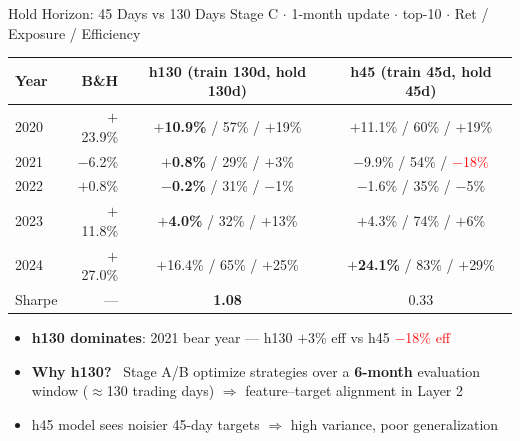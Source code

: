 \documentclass[aspectratio=169]{beamer}
\begin{document}
\begin{frame}{Hold Horizon: 45 Days vs 130 Days}
  \small
  Stage C $\cdot$ 1-month update $\cdot$ top-10 $\cdot$ Ret / Exposure / Efficiency

  \vspace{0.4em}
  \begin{tabular}{lrcc}
    \toprule
    Year & B\&H & \textbf{h130} (train 130d, hold 130d) & h45 (train 45d, hold 45d) \\
    \midrule
    2020 & $+$23.9\% & \textbf{$+$10.9\%} / 57\% / $+$19\% & $+$11.1\% / 60\% / $+$19\% \\
    2021 & $-$6.2\%  & \textbf{$+$0.8\%} / 29\% / $+$3\%  & $-$9.9\% / 54\% / \textcolor{red}{$-$18\%} \\
    2022 & $+$0.8\%  & \textbf{$-$0.2\%} / 31\% / $-$1\%  & $-$1.6\% / 35\% / $-$5\% \\
    2023 & $+$11.8\% & \textbf{$+$4.0\%} / 32\% / $+$13\% & $+$4.3\% / 74\% / $+$6\% \\
    2024 & $+$27.0\% & $+$16.4\% / 65\% / $+$25\% & \textbf{$+$24.1\%} / 83\% / $+$29\% \\
    \midrule
    Sharpe & --- & \textbf{1.08} & 0.33 \\
    \bottomrule
  \end{tabular}

  \vspace{0.4em}
  \begin{itemize}
    \item \textbf{h130 dominates}: 2021 bear year — h130 $+$3\% eff vs h45 \textcolor{red}{$-$18\% eff}
    \item \textbf{Why h130?} \ Stage A/B optimize strategies over a \textbf{6-month} evaluation window
      ($\approx$130 trading days) $\Rightarrow$ feature--target alignment in Layer 2
    \item h45 model sees noisier 45-day targets $\Rightarrow$ high variance, poor generalization
  \end{itemize}
\end{frame}
\end{document}
